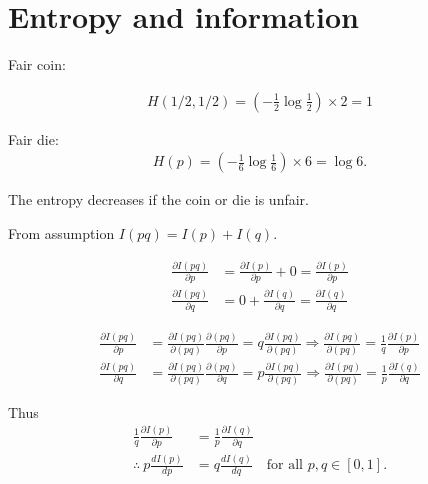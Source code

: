 
\chapter{Entropy and information}
Fair coin:

\begin{align}
    H({1/2, 1/2}) = \left( - \frac{1}{2} \log \frac{1}{2} \right) \times 2 = 1
\end{align}


Fair die:
\begin{align}
    H(p) = \left( - \frac{1}{6} \log \frac{1}{6} \right) \times 6 = \log 6.
\end{align}


The entropy decreases if the coin or die is unfair.




From assumption $I(pq) = I(p) + I(q)$.

\begin{align}
    \frac{\partial I(pq)}{\partial p} &= \frac{\partial I(p)}{\partial p} + 0 = \frac{\partial I(p)}{\partial p}\\
    \frac{\partial I(pq)}{\partial q} &= 0 + \frac{\partial I(q)}{\partial q} = \frac{\partial I(q)}{\partial q}
\end{align}


\begin{align}
    \frac{\partial I(pq)}{\partial p}
        &=  \frac{\partial I(pq)}{\partial (pq)} \frac{\partial (pq)}{\partial p}
        = q \frac{\partial I(pq)}{\partial(pq)}
    \Rightarrow \frac{\partial I(pq)}{\partial(pq)} = \frac{1}{q} \frac{\partial I(p)}{\partial p}\\
%
    \frac{\partial I(pq)}{\partial q}
        &=  \frac{\partial I(pq)}{\partial (pq)} \frac{\partial (pq)}{\partial q}
        = p \frac{\partial I(pq)}{\partial(pq)}
    \Rightarrow \frac{\partial I(pq)}{\partial(pq)} = \frac{1}{p} \frac{\partial I(q)}{\partial q}
\end{align}

Thus
\begin{align}
    \frac{1}{q} \frac{\partial I(p)}{\partial p} &= \frac{1}{p} \frac{\partial I(q)}{\partial q}\\
    \therefore~ p \frac{d I(p)}{d p} &= q \frac{d I(q)}{d q} ~~~\text{ for all } p,q \in [0,1].\\
\end{align}

